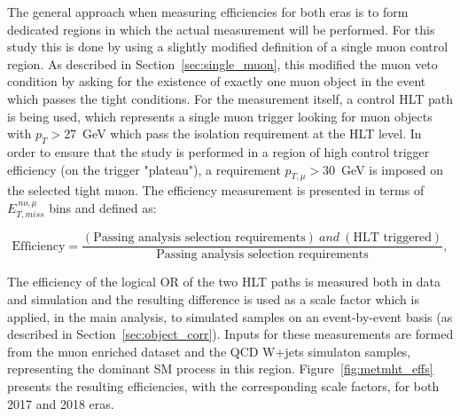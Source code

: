 \hspace{10pt} The general approach when measuring efficiencies for both eras is to form dedicated regions in which the actual measurement will be performed. For this study this is done by using a slightly modified definition of a single muon control region. As described in Section~\ref{sec:single_muon}, this modified the muon veto condition by asking for the existence of exactly one muon object in the event which passes the tight conditions. For the measurement itself, a control HLT path is being used, which represents a single muon trigger looking for muon objects with $p_T>$27~GeV which pass the isolation requirement at the HLT level. In order to ensure that the study is performed in a region of high control trigger efficiency (on the trigger "plateau"), a requirement $p_{T,\mu}>30$~GeV is imposed on the selected tight muon. The efficiency measurement is presented in terms of $E_{T,miss}^{~no,\mu}$ bins and defined as:

\begin{equation}
\text{Efficiency} = \frac{(\text{Passing analysis selection requirements})~and~(\text{HLT triggered})}{\text{Passing analysis selection requirements}},
\end{equation}

The efficiency of the logical OR of the two HLT paths is measured both in data and simulation and the resulting difference is used as a scale factor which is applied, in the main analysis, to simulated samples on an event-by-event basis (as described in Section~\ref{sec:object_corr}). Inputs for these measurements are formed from the muon enriched dataset and the QCD W+jets simulaton samples, representing the dominant SM process in this region. Figure~\ref{fig:metmht_effs} presents the resulting efficiencies, with the corresponding scale factors, for both 2017 and 2018 eras.

